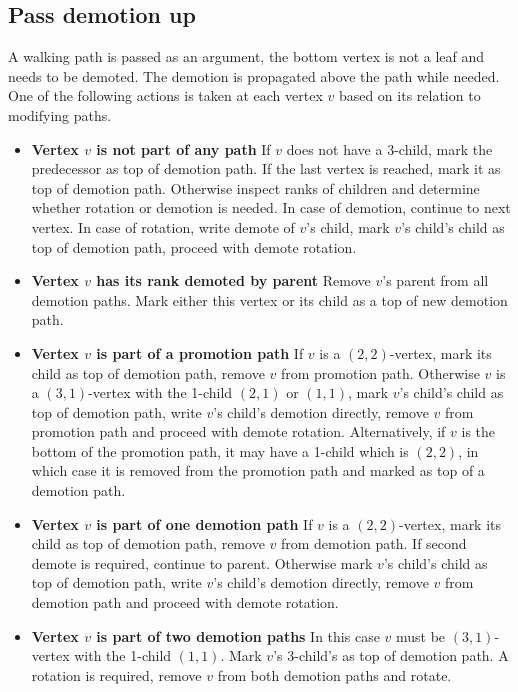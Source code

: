 \subsection{Pass demotion up}

A walking path is passed as an argument, the bottom vertex is not a leaf and needs to be demoted. The demotion is propagated above the path while needed. One of the following actions is taken at each vertex $v$ based on its relation to modifying paths.

\begin{itemize}

\item {\bfseries Vertex $v$ is not part of any path} If $v$ does not have a 3-child, mark the predecessor as top of demotion path. If the last vertex is reached, mark it as top of demotion path.  Otherwise inspect ranks of children and determine whether rotation or demotion is needed. In case of demotion, continue to next vertex. In case of rotation, write demote of $v$'s child, mark $v$'s child's child as top of demotion path, proceed with demote rotation.

\item {\bfseries Vertex $v$ has its rank demoted by parent} Remove $v$'s parent from all demotion paths. Mark either this vertex or its child as a top of new demotion path.

\item {\bfseries Vertex $v$ is part of a promotion path} If $v$ is a $(2,2)$-vertex, mark its child as top of demotion path, remove $v$ from promotion path. Otherwise $v$ is a $(3,1)$-vertex with the 1-child $(2,1)$ or $(1,1)$, mark $v$'s child's child as top of demotion path, write $v$'s child's demotion directly, remove $v$ from promotion path and proceed with demote rotation. Alternatively, if $v$ is the bottom of the promotion path, it may have a 1-child which is $(2,2)$, in which case it is removed from the promotion path and marked as top of a demotion path.

\item {\bfseries Vertex $v$ is part of one demotion path} If $v$ is a $(2,2)$-vertex, mark its child as top of demotion path, remove $v$ from demotion path. If second demote is required, continue to parent. Otherwise mark $v$'s child's child as top of demotion path, write $v$'s child's demotion directly, remove $v$ from demotion path and proceed with demote rotation. 

\item {\bfseries Vertex $v$ is part of two demotion paths} In this case $v$ must be $(3,1)$-vertex with the 1-child $(1,1)$. Mark $v$'s 3-child's as top of demotion path. A rotation is required, remove $v$ from both demotion paths and rotate.

\end{itemize}

